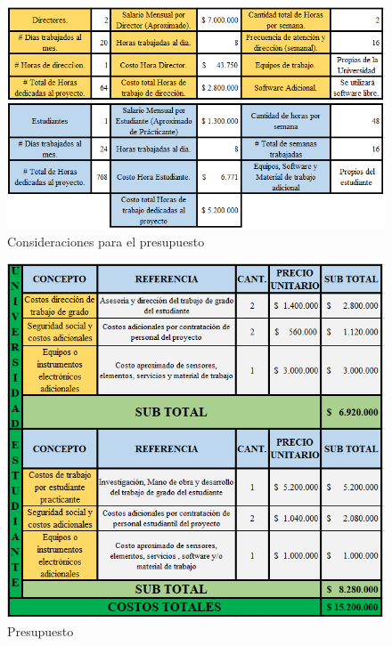 		\begin{figure}
			\begin{center}
				\includegraphics{img/consideraciones2.png}
			\end{center}
			\caption{Consideraciones para el presupuesto \label{tabconsideraciones}}
		\end{figure}
		\begin{figure}
			\begin{center}
				\includegraphics{img/presuTot.png}
			\end{center}
			\caption{Presupuesto \label{tabpresupuesto}}
		\end{figure}

